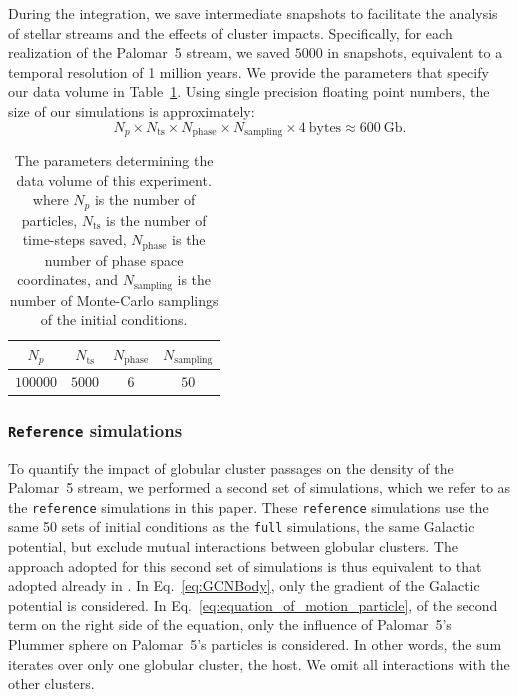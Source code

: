 \documentclass{aa}
\begin{document}
      During the integration, we save intermediate snapshots to facilitate the analysis of stellar streams and the effects of cluster impacts. Specifically, for each realization of the Palomar~5 stream, we saved $5000$ in snapshots, equivalent to a temporal resolution of 1 million years. We provide the parameters that specify our data volume in Table~\ref{tab:data_volume}. Using single precision floating point numbers, the size of our simulations is approximately:
    \begin{equation} \label{eq:data_volume_estimate}
      N_p \times N_{\textrm{ts}}\times N_{\textrm{phase}}\times N_{\textrm{sampling}} \times 4~\textrm{bytes}\approx 600~\textrm{Gb}.
    \end{equation}

    \begin{table}[h]
      \centering
      \begin{tabular}{|c|c|c|c|}
          \hline
          $N_p$ & $N_{\textrm{ts}}$ & $N_{\textrm{phase}}$ & $N_{\textrm{sampling}}$ \\
          \hline
          $100000$ & $5000$ & $6$ & $50$ \\
          \hline
      \end{tabular}
      \caption{The parameters determining the data volume of this experiment. where $N_p$  is the number of particles, $N_{\textrm{ts}}$ is the number of time-steps saved, $N_{\textrm{phase}}$ is the number of phase space coordinates, and $N_{\textrm{sampling}}$ is the number of Monte-Carlo samplings of the initial conditions.}
      \label{tab:data_volume}
    \end{table}

  \subsubsection*{ \texttt{Reference} simulations}

    To quantify the impact of globular cluster passages on the density of the Palomar~5 stream, we performed a second set of simulations, which we refer to as the \texttt{reference} simulations in this paper.  These \texttt{reference} simulations use the same 50 sets of initial conditions as the \texttt{full} simulations, the same Galactic potential, but exclude mutual interactions between globular clusters. The approach adopted for this second set of simulations is thus equivalent to that adopted already in \citet{2023A&A...673A..44F}. In Eq.~\ref{eq:GCNBody}, only the gradient of the Galactic potential is considered. In Eq.~\ref{eq:equation_of_motion_particle}, of the second term on the right side of the equation, only the influence of Palomar~5's Plummer sphere on Palomar~5's particles is considered. In other words, the sum iterates over only one globular cluster, the host. We omit all interactions with the other clusters.
\end{document}
